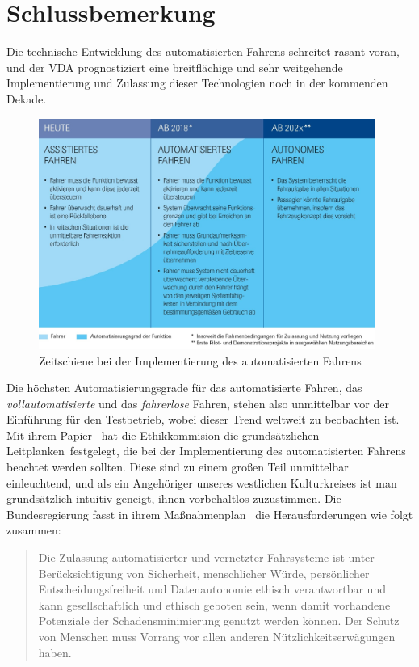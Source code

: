 \documentclass[twoside,a4paper,12pt]{article}
\begin{document}
\newpage

\cleardoublepage
\section{Schlussbemerkung}

Die technische Entwicklung des automatisierten Fahrens schreitet rasant voran, und der VDA prognostiziert eine breitflächige und sehr weitgehende Implementierung
und Zulassung dieser Technologien noch in der kommenden Dekade.\\

\begin{figure}[H]
\centering
\includegraphics[width=11cm]{resources/zeitschiene-automatisierungsgrade.jpg}
\caption[Zeitschiene bei der Implementierung des automatisierten Fahrens]{Zeitschiene bei der Implementierung des automatisierten Fahrens~\cite{vda}}
\label{figure:ZeitschieneAutomatisierungsgrade}
\end{figure}

Die höchsten Automatisierungsgrade für das automatisierte Fahren, das \textit{vollautomatisierte} und das \textit{fahrerlose} Fahren, stehen also unmittelbar
vor der Einführung für den Testbetrieb, wobei dieser Trend weltweit zu beobachten ist.
Mit ihrem Papier~\cite{ek} hat die Ethikkommision die grundsätzlichen \glqq Leitplanken\grqq\ festgelegt, die bei der Implementierung des automatisierten Fahrens
beachtet werden sollten. Diese sind zu einem großen Teil unmittelbar einleuchtend, und als ein Angehöriger unseres westlichen Kulturkreises ist man grundsätzlich
intuitiv geneigt, ihnen vorbehaltlos zuzustimmen. Die Bundesregierung fasst in ihrem Maßnahmenplan~\cite{bmvi5} die Herausforderungen wie folgt zusammen:

\begin{quote}
\glqq
Die Zulassung automatisierter und vernetzter Fahrsysteme ist unter Berücksichtigung von Sicherheit, menschlicher Würde, persönlicher Entscheidungsfreiheit und Datenautonomie ethisch verantwortbar und kann gesellschaftlich und ethisch geboten sein, wenn damit vorhandene Potenziale der Schadensminimierung genutzt werden können. Der Schutz von Menschen muss Vorrang vor allen anderen Nützlichkeitserwägungen haben.\grqq\mbox{~\cite[S. 3]{bmvi5}}
\end{quote}
\end{document}
